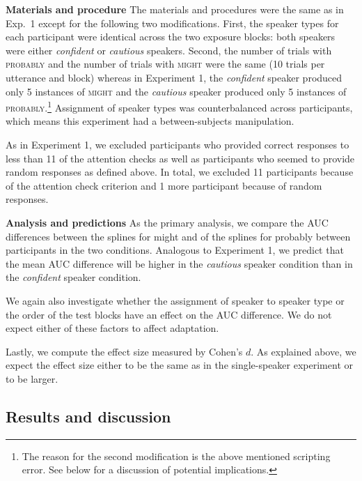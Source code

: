 \documentclass[10pt,letterpaper]{article}
\begin{document}
\noindent \textbf{Materials and procedure} The materials and procedures were the same as in Exp.~1 except for the following two modifications.
First, the speaker types for each participant were identical across the two exposure blocks: both speakers were either \textit{confident} or \textit{cautious} speakers.
Second, the number of trials with \textsc{probably} and the number of trials with \textsc{might} were the same (10 trials per utterance and block) whereas in Experiment 1, the \textit{confident} speaker
 produced only 5 instances of \textsc{might} and the \textit{cautious} speaker produced  only 5 instances of \textsc{probably}.\footnote{The reason for the second modification is the above mentioned scripting error. See below for a discussion of potential implications.} Assignment of speaker types was counterbalanced across participants, which means this experiment had a between-subjects manipulation.

  
As in Experiment 1, we excluded participants who provided correct responses to less than 11 of the attention checks as well as participants who seemed to provide random responses as defined above. In total, we excluded 11 participants because of the attention check criterion and 1 more participant because of random responses. 


\noindent \textbf{Analysis and predictions} 
As the primary analysis, we compare the AUC differences between the splines for 
{\sc might} and of the splines for {\sc probably} between participants in the two conditions.
Analogous to Experiment 1, we predict that the mean AUC difference
will be higher in the \emph{cautious} speaker condition than in the \emph{confident} speaker condition.

We again also investigate whether the assignment of speaker to speaker type or the order 
of the test blocks have an effect on the AUC difference. We do not expect either of these factors
to affect adaptation.

Lastly, we compute the effect size measured by Cohen's $d$. As explained above, we expect
the effect size either to be the same as in the single-speaker experiment or to be larger. 


\subsection{Results and discussion}
\end{document}
